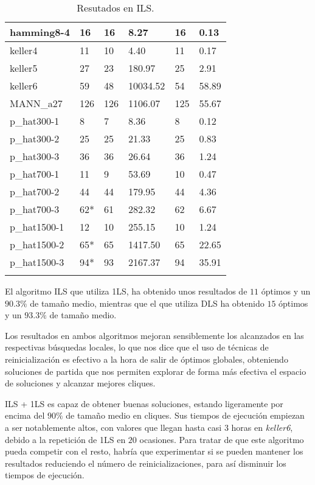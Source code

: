 \begin{small}
\begin{longtable}{l l l l l l}
    hamming8-4         & 16 & 16 & 8.27 & 16 & 0.13\\ \hline
    keller4            & 11 & 10 & 4.40 & 11 & 0.17 \\ \hline
    keller5            & 27 & 23 & 180.97 & 25 & 2.91 \\ \hline
    keller6            & 59 & 48 & 10034.52 & 54 & 58.89\\ \hline
    MANN\_a27          & 126 & 126 & 1106.07 & 125 & 55.67 \\ \hline
    p\_hat300-1        & 8 & 7 & 8.36 & 8 & 0.12 \\ \hline
    p\_hat300-2        & 25 & 25 & 21.33 & 25 & 0.83\\ \hline
    p\_hat300-3        & 36 & 36 & 26.64 & 36 & 1.24\\ \hline
    p\_hat700-1        & 11 & 9 & 53.69 & 10 & 0.47\\ \hline
    p\_hat700-2        & 44 & 44 & 179.95 & 44 & 4.36\\ \hline
    p\_hat700-3        & 62* & 61 & 282.32 & 62 & 6.67 \\ \hline
    p\_hat1500-1       & 12 & 10 & 255.15 & 10 & 1.24\\ \hline
    p\_hat1500-2       & 65* & 65 & 1417.50 & 65 & 22.65\\ \hline
    p\_hat1500-3       & 94* & 93 & 2167.37 & 94 & 35.91\\ \hline
  \caption{Resutados en ILS.}
\end{longtable}
\end{small}

El algoritmo ILS que utiliza 1LS, ha obtenido unos resultados de $11$ óptimos y
un $90.3\%$ de tamaño medio, mientras que el que utiliza DLS ha obtenido $15$
óptimos y un $93.3\%$ de tamaño medio.

Los resultados en ambos algoritmos mejoran sensiblemente los alcanzados en las
respectivas búsquedas locales, lo que nos dice que el uso de técnicas de reinicialización
es efectivo a la hora de salir de óptimos globales, obteniendo soluciones de partida
que nos permiten explorar de forma más efectiva el espacio de soluciones y alcanzar
mejores cliques.

ILS + 1LS es capaz de obtener buenas soluciones, estando ligeramente por encima del
$90\%$ de tamaño medio en cliques. Sus tiempos de ejecución empiezan a ser notablemente
altos, con valores que llegan hasta casi $3$ horas en \textit{keller6}, debido a
la repetición de 1LS en $20$ ocasiones. Para tratar de que este algoritmo pueda
competir con el resto, habría que experimentar si se pueden mantener los resultados
reduciendo el número de reinicializaciones, para así disminuir los tiempos de ejecución.

